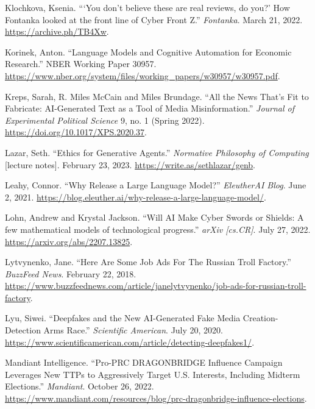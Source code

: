\documentclass{article}
\begin{document}
\begin{thebibliography}{9}
  Klochkova, Ksenia. ```You don't believe these are real reviews, do you?' How Fontanka looked at the front line of Cyber Front Z.'' \textit{Fontanka}. March 21, 2022. \href{https://archive.ph/TB4Xw}{https://archive.ph/TB4Xw}.

  Korinek, Anton. ``Language Models and Cognitive Automation for Economic Research.'' NBER Working Paper 30957. \href{https://www.nber.org/system/files/working_papers/w30957/w30957.pdf}{https://www.nber.org/system/files/working\_papers/w30957/w30957.pdf}. 

  Kreps, Sarah, R. Miles McCain and Miles Brundage. ``All the News That's Fit to Fabricate: AI-Generated Text as a Tool of Media Misinformation.'' \textit{Journal of Experimental Political Science} 9, no. 1 (Spring 2022). \href{https://doi.org/10.1017/XPS.2020.37}{https://doi.org/10.1017/XPS.2020.37}.

  Lazar, Seth. ``Ethics for Generative Agents.'' \textit{Normative Philosophy of Computing} [lecture notes]. February 23, 2023. \href{https://write.as/sethlazar/genb}{https://write.as/sethlazar/genb}. 

  Leahy, Connor. ``Why Release a Large Language Model?'' \textit{EleutherAI Blog}. June 2, 2021. \href{https://blog.eleuther.ai/why-release-a-large-language-model/}{https://blog.eleuther.ai/why-release-a-large-language-model/}.

  Lohn, Andrew and Krystal Jackson. ``Will AI Make Cyber Swords or Shields: A few mathematical models of technological progress.'' \textit{arXiv [cs.CR]}. July 27, 2022. \href{https://arxiv.org/abs/2207.13825}{https://arxiv.org/abs/2207.13825}. 

  Lytvynenko, Jane. ``Here Are Some Job Ads For The Russian Troll Factory.'' \textit{BuzzFeed News}. February 22, 2018. \href{https://www.buzzfeednews.com/article/janelytvynenko/job-ads-for-russian-troll-factory}{https://www.buzzfeednews.com/article/janelytvynenko/job-ads-for-russian-troll-factory}.

  Lyu, Siwei. ``Deepfakes and the New AI-Generated Fake Media Creation-Detection Arms Race.'' \textit{Scientific American}. July 20, 2020. \href{https://www.scientificamerican.com/article/detecting-deepfakes1/}{https://www.scientificamerican.com/article/detecting-deepfakes1/}.

  Mandiant Intelligence. ``Pro-PRC DRAGONBRIDGE Influence Campaign Leverages New TTPs to Aggressively Target U.S. Interests, Including Midterm Elections.'' \textit{Mandiant}. October 26, 2022. \href{https://www.mandiant.com/resources/blog/prc-dragonbridge-influence-elections}{https://www.mandiant.com/resources/blog/prc-dragonbridge-influence-elections}.


\end{thebibliography}
\end{document}

